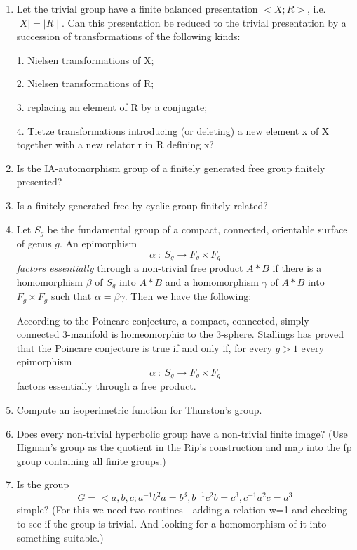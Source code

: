 \begin{enumerate}
\item Let the trivial group have a
finite  balanced presentation
$<X;R>$, i.e. $\mid X\mid = \mid R \mid$. Can this presentation
be reduced to the trivial presentation by a succession of
transformations of the following kinds:

1. Nielsen transformations of X;


2. Nielsen transformations of R;

3. replacing an element of R by a conjugate;

4. Tietze transformations introducing (or deleting) a new 
element x of X together with a new relator r in R defining x?

\item Is the IA-automorphism
 group of a finitely generated free group finitely presented?



\item Is a finitely generated free-by-cyclic
group finitely related?

\item
Let $S_g$ be the fundamental group of a compact, connected, orientable
surface of genus $g$. An epimorphism 
$$\alpha \ : \ S_g \rightarrow F_g \times F_g$$
{\it factors essentially} through a non-trivial free product
$A \ast B$ if there is a homomorphism 
$\beta$ of $S_g$ into $A \ast B$ and a homomorphism 
$\gamma$ of $A \ast B$ into $F_g \times F_g$ such that
$\alpha = \beta \gamma$. Then we have the following:

According to the  Poincare conjecture, a compact,
connected, simply-connected 3-manifold is homeomorphic to the 3-sphere. 
Stallings has proved that the Poincare conjecture is true if and
only if, for every $g>1$  every epimorphism 
$$\alpha \ : \ S_g \rightarrow F_g \times F_g$$
factors essentially through a free product.

\item Compute an isoperimetric function for
Thurston's group.



\item Does every non-trivial hyperbolic group have a non-trivial finite
image? 
(Use Higman's group as the quotient in the Rip's construction and map into
the fp group containing all finite groups.)

\item Is the group
$$G =<a,b,c;a^{-1}b^2a=b^3,b^{-1}c^2 b=c^3, c^{-1}a^2 c=a^3$$
simple?
(For this we need two routines - adding a relation w=1 and checking to
see if the group is trivial.
And looking for a homomorphism of it into something suitable.)

\end{enumerate}
